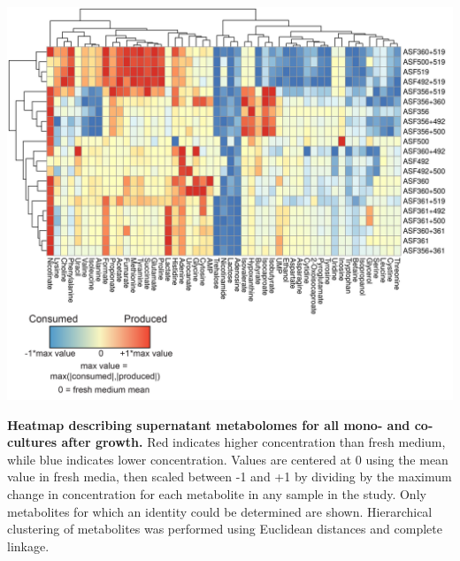 \documentclass[11pt,twocolumn,notitlepage,openany,twoside]{book}
\begin{document}
\begin{refsection}
\begin{suppfigure*}
\centering
\includegraphics[width=\textwidth]{ch2_figS1}
\caption[Heatmap describing supernatant metabolomes for all mono- and co-cultures after growth.]{\textbf{Heatmap describing supernatant metabolomes for all mono- and co-cultures after growth.} Red indicates higher concentration than fresh medium, while blue indicates lower concentration. Values are centered at 0 using the mean value in fresh media, then scaled between -1 and +1 by dividing by the maximum change in concentration for each metabolite in any sample in the study. Only metabolites for which an identity could be determined are shown. Hierarchical clustering of metabolites was performed using Euclidean distances and complete linkage.}
\end{suppfigure*}


\end{refsection}
\end{document}
